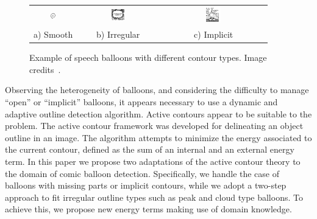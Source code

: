 	\begin{figure}[!ht]%
	\begin{center}
	  \begin{tabular}{ccc}
	  \includegraphics[trim= 0px 2px 0mm 0mm, clip, width=0.13\textwidth]{round_balloon.png}&
	  \includegraphics[trim= 0mm 0mm 0mm 0mm, clip, width=0.17\textwidth]{peaked_balloon.png}&
	  \includegraphics[trim= 15px 7mm 5px 0mm, clip, width=0.145\textwidth]{open_balloon.png} \\ 
	  \footnotesize a) Smooth	& \footnotesize b) Irregular & \footnotesize c) Implicit
	  \end{tabular}
	\caption{Example of speech balloons with different contour types. Image credits~\cite{Bubble09}.}
	\label{fig:se:se:balloon_examples}
	\end{center}
	\end{figure}	

Observing the heterogeneity of balloons, and considering the difficulty to manage ``open'' or ``implicit'' balloons, it appears necessary to use a dynamic and adaptive outline detection algorithm.
Active contours appear to be suitable to the problem.
The active contour framework was developed for delineating an object outline in an image.
The algorithm attempts to minimize the energy associated to the current contour, defined as the sum of an internal and an external energy term. 
In this paper we propose two adaptations of the active contour theory to the domain of comic balloon detection.
Specifically, we handle the case of balloons with missing parts or implicit contours, while we adopt a two-step approach to fit irregular outline types such as peak and cloud type balloons. 
To achieve this, we propose new energy terms making use of domain knowledge.


